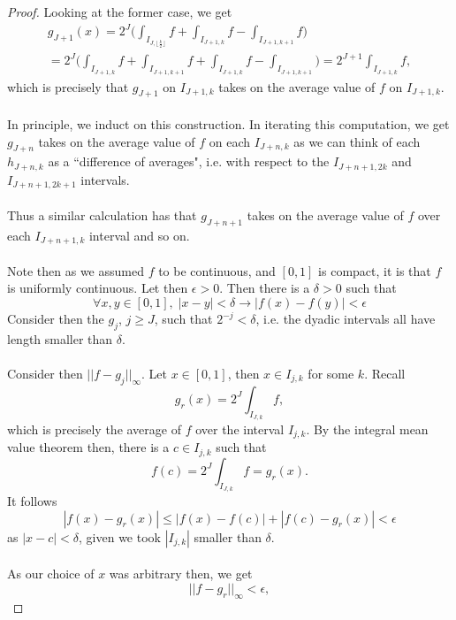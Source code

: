 \documentclass[12pt]{article}
\newenvironment{ex}[2][Exercise]{\begin{trivlist}
\item[\hskip \labelsep {\bfseries #1}\hskip \labelsep {\bfseries #2.}]}{\end{trivlist}}
\begin{document}
\begin{ex}{14}
\begin{enumerate}[label=14.\arabic*]
\begin{proof}
            Looking at the former case, we get 
            \begin{align*}g_{J + 1}(x) = 2^J \Big (\int_{I_{J, \lfloor \frac{k}{2} \rfloor}} f + \int_{I_{J + 1, k}} f - \int_{I_{J + 1, k + 1}} f \Big) \\
                 = 2^J \Big (\int_{I_{J + 1, k}} f + \int_{I_{J + 1, k + 1}} f + \int_{I_{J + 1, k}} f - \int_{I_{J + 1, k + 1}} \Big) = 2^{J + 1}\int_{I_{J + 1, k}} f,
            \end{align*}
            which is precisely that $g_{J + 1}$ on $I_{J + 1,k}$ takes on the average value of $f$ on $I_{J + 1, k}$. \\ \\
            In principle, we induct on this construction. In iterating this computation, we get $g_{J + n}$ takes on the average value of $f$ on each $I_{J + n, k}$ as we can think of each $h_{J + n, k}$ as a ``difference of averages", i.e. with respect to the $I_{J + n + 1, 2k}$ and $I_{J + n + 1, 2k + 1}$ intervals. \\ \\
            Thus a similar calculation has that $g_{J + n + 1}$ takes on the average value of $f$ over each $I_{J + n + 1, k}$ interval and so on. \\ \\
            Note then as we assumed $f$ to be continuous, and $[0,1]$ is compact, it is that $f$ is uniformly continuous. Let then $\epsilon > 0$. Then there is a $\delta > 0$ such that 
            $$\forall x, y \in [0,1], \; |x - y| < \delta \longrightarrow |f(x) - f(y)| < \epsilon$$
            Consider then the $g_j$, $j \geq J$, such that $2^{-j} < \delta$, i.e. the dyadic intervals all have length smaller than $\delta$. \\ \\
            Consider then $||f - g_j||_\infty$. Let $x \in [0,1]$, then $x \in I_{j, k}$ for some $k$. Recall
            $$g_r(x) = 2^J \int_{I_{J, k}} f,$$
            which is precisely the average of $f$ over the interval $I_{j,k}$. By the integral mean value theorem then, there is a $c \in I_{j, k}$ such that 
            $$f(c) = 2^J \int_{I_{J, k}} f = g_r(x).$$
            It follows
            $$|f(x) - g_r(x)| \leq |f(x) - f(c)| + |f(c) - g_r(x)| < \epsilon$$
            as $|x - c| < \delta$, given we took $|I_{j,k}|$ smaller than $\delta$. \\ \\
            As our choice of $x$ was arbitrary then, we get 
            $$||f - g_r||_\infty < \epsilon,$$

\end{proof}
\end{enumerate}
\end{ex}
\end{document}
